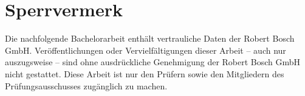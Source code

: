 \newpage
\section*{Sperrvermerk}
\thispagestyle{empty}

Die nachfolgende Bachelorarbeit enthält vertrauliche Daten der Robert Bosch GmbH. Veröffentlichungen oder Vervielfältigungen dieser Arbeit – auch nur auszugsweise – sind ohne ausdrückliche Genehmigung der Robert Bosch GmbH nicht gestattet. Diese Arbeit ist nur den Prüfern sowie den Mitgliedern des Prüfungsausschusses zugänglich zu machen.